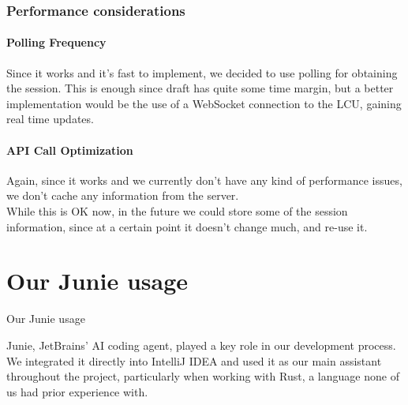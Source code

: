 \documentclass[12pt, a4paper]{article}
\renewcommand{\headrulewidth}{0.4pt}
\begin{document}
    \newpage
    \section{Performance considerations}

    \subsection{Polling Frequency}

    Since it works and it's fast to implement, we decided to use polling for obtaining the session. This is enough since draft has quite some time margin, but a better implementation would be the use of a WebSocket connection to the LCU, gaining real time updates.

    \subsection{API Call Optimization}

    Again, since it works and we currently don't have any kind of performance issues, we don't cache any information from the server.
    \\
    While this is OK now, in the future we could store some of the session information, since at a certain point it doesn't change much, and re-use it.

    \newpage
    \part{Our Junie usage}
    \pagestyle{fancy}
    \fancyhf{}
    \fancyfoot[C]{\thepage}
    \renewcommand{\headrulewidth}{0.4pt}
    \thispagestyle{empty}
    \vspace*{1cm}
    \begin{center}
        \LARGE
        Our Junie usage

        \vfill

        \begin{minipage}{0.8\textwidth}
            \normalsize
            \noindent Junie, JetBrains' AI coding agent, played a key role in our development process. We integrated it directly into IntelliJ IDEA and used it as our main assistant throughout the project, particularly when working with Rust, a language none of us had prior experience with.
        \end{minipage}

        \vspace{2cm}
    \end{center}
    \newpage
\end{document}

